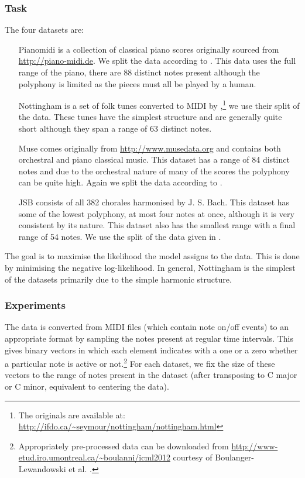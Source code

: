 \subsubsection{Task}
The four datasets are:
\begin{itemize}
\item[Pianomidi] {
	is a collection of classical piano scores originally sourced from
	\url{http://piano-midi.de}. We split the data according to
	\autocite{Poliner2007}. This data uses the full range of the piano,
	there are 88 distinct notes present although the polyphony is limited
	as the pieces must all be played by a human.}
\item[Nottingham] {
	is a set of folk tunes converted to MIDI by 
	\autocite{Boulanger-Lewandowski2012},\footnote{
	The originals are available at: \url{http://ifdo.ca/~seymour/nottingham/nottingham.html}}
	we use their split of the data. These tunes have the simplest structure and are
	generally quite short although they span a range of 63 distinct notes.}
\item[Muse] {
	comes originally from \url{http://www.musedata.org} and contains both orchestral and
	piano classical music. This dataset has a range of 84 distinct notes and due to the
	orchestral nature of many of the scores the polyphony can be quite high. Again we
	split the data according to \autocite{Boulanger-Lewandowski2012}.}
\item[JSB] {
	consists of all 382 chorales harmonised by J. S. Bach. This dataset has some of the
	lowest polyphony, at most four notes at once, although it is very consistent by its
	nature. This dataset also has the smallest range with a final range of 54 notes.
	We use the split of the data given in \autocite{Allan2004}.}
\end{itemize}

The goal is to maximise the likelihood the model assigns to the data. This is done
by minimising the negative log-likelihood. In general, Nottingham is the simplest of
the datasets primarily due to the simple harmonic structure.


\subsubsection{Experiments}
The data is converted from MIDI files (which contain note on/off events) to
an appropriate format by sampling the notes present at regular time intervals.
This gives binary vectors in which each element indicates with a one or a zero whether
a particular note is active or not.\footnote{Appropriately pre-processed data can
be downloaded from \url{http://www-etud.iro.umontreal.ca/~boulanni/icml2012}
courtesy of Boulanger-Lewandowski et al. \autocite{Boulanger-Lewandowski2012}.}
For each dataset, we fix the size of these vectors to the range of notes present in the
dataset (after transposing to C major or C minor, equivalent to centering the data).


